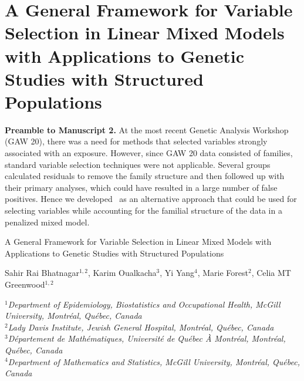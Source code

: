 \chapter{A General Framework for Variable Selection in Linear Mixed Models with Applications to Genetic Studies with Structured Populations\label{ch:ggmix}}

\indent \textbf{Preamble to Manuscript 2.} At the most recent Genetic Analysis Workshop (GAW 20), there was a need for methods that selected variables strongly associated with an exposure. However, since GAW 20 data consisted of families, standard variable selection techniques were not applicable. Several groups calculated residuals to remove the family structure and then followed up with their primary analyses, which could have resulted in a large number of false positives. Hence we developed \ggmix ~as an alternative approach that could be used for selecting variables while accounting for the familial structure of the data in a penalized mixed model. \newpage

\vspace*{2cm}

\begin{center}
	\Large{A General Framework for Variable Selection in Linear Mixed Models with Applications to Genetic Studies with Structured Populations}
\end{center}

\vspace*{4cm}

\begin{center}
	Sahir Rai Bhatnagar$^{1,2}$, Karim Oualkacha$^{3}$, Yi Yang$^{4}$, Marie Forest$^{2}$, Celia MT Greenwood$^{1,2}$
\end{center}

\vspace*{1cm}

\begin{center}
$^{1}$\textit{Department of Epidemiology, Biostatistics and Occupational Health, McGill University, Montr\'{e}al, Qu\'{e}bec, Canada}\\
$^{2}$\textit{Lady Davis Institute, Jewish General Hospital, Montr\'{e}al, Qu\'{e}bec, Canada}\\
$^{3}$\textit{Département de Mathématiques, Université de Québec À Montréal, Montr\'{e}al, Qu\'{e}bec, Canada}\\
$^{4}$\textit{Department of Mathematics and Statistics, McGill University, Montr\'{e}al, Qu\'{e}bec, Canada}\\
\end{center}



